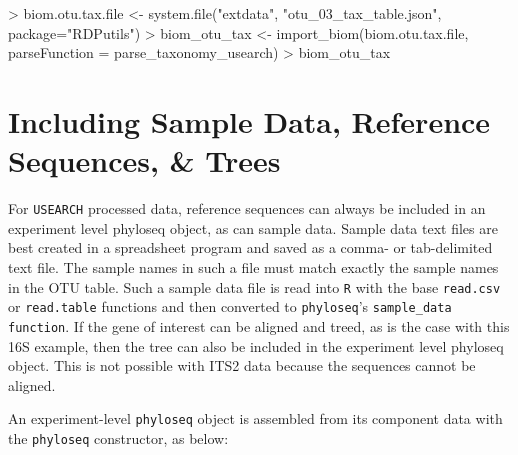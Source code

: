 \documentclass{article}
\begin{document}
\begin{Schunk}
\begin{Sinput}
> biom.otu.tax.file <- system.file("extdata", "otu_03_tax_table.json", package="RDPutils")
> biom_otu_tax <- import_biom(biom.otu.tax.file, parseFunction = parse_taxonomy_usearch)
> biom_otu_tax
\end{Sinput}
\end{Schunk}

\section*{Including Sample Data, Reference Sequences, \& Trees}  

For \texttt{USEARCH} processed data, reference sequences can always be included in an experiment level phyloseq object, as can sample data. Sample data text files are best created in a spreadsheet program and saved as a comma- or tab-delimited text file. The sample names in such a file must match exactly the sample names in the OTU table. Such a sample data file is read into \texttt{R} with the base \texttt{read.csv} or \texttt{read.table} functions and then converted to \texttt{phyloseq}'s \texttt{sample\_data function}. If the gene of interest can be aligned and treed, as is the case with this 16S example, then the tree can also be included in the experiment level phyloseq object. This is not possible with ITS2 data because the sequences cannot be aligned.   

An experiment-level \texttt{phyloseq} object is assembled from its component data with the \texttt{phyloseq} constructor, as below:  
\end{document}
